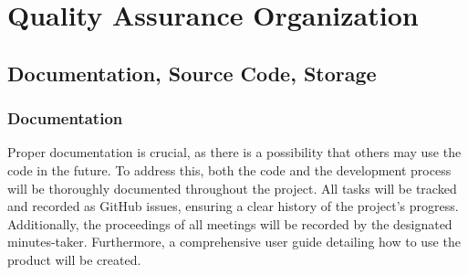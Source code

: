 \section{Quality Assurance Organization}

\subsection{Documentation, Source Code, Storage} \label{sec:documentation_storage_source_code}

\begin{comment}
    Documentation
        Andre skal kanskje bruke eller gjenbruke produktet vårt, så viktig med dokumentasjon av både sluttproduktet, i tillegg til hele prosessen.

        Commitmeldingsstandard

        Kode-produkter(?)
            Deployment
            APIdoc

        Arbeidsprosessen
            Så mye som mulig skal ligge under issues under GitHub Project, slik at vi dokumenterer hva vi har gjort. Timeføring blir gjort i Traggo som er tag-basert, slik at vi kan se hvor lenge vi har jobbet med feks admin, thesis, metting osv.
        
        Møter og enigheter
            Møtenotater/referat skal bli tatt av alle møter
            Alle viktige valg som blir gjort etter diskusjoner blir notert

    Source code
        Dokumentasjon av koden kommer til å bli brukt av gruppemedlemene, men kan også bli brukt av noen som vil videreutvikle produktet.
        Følge industri-standard dokumentasjon og kodestil for hvert kodespråk, med hyppig bruk av en linter. 
        Prøve å skrive self-documenting code ved å ha descriptive funksjonsnavn og variabler, slik at man kan holde kodekommentarene korte og konsise
        
\end{comment}
\subsubsection{Documentation}  
Proper documentation is crucial, as there is a possibility that others may use the code in the future. To address this, both the code and the development process will be thoroughly documented throughout the project. All tasks will be tracked and recorded as GitHub issues, ensuring a clear history of the project's progress. Additionally, the proceedings of all meetings will be recorded by the designated minutes-taker. Furthermore, a comprehensive user guide detailing how to use the product will be created.  

